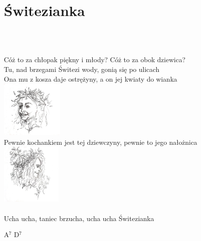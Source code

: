 \documentclass[a5paper, 10pt]{book}
\begin{document}
\section{Świtezianka}\textcolor{lightgray}{\textit{}}\\~\\
\begin{minipage}[t]{0.8\textwidth}
Cóż to za chłopak piękny i młody? Cóż to za obok dziewica?\\
Tu, nad brzegami Świtezi wody, gonią się po ulicach\\
Ona mu z kosza daje ostrężyny, a on jej kwiaty do wianka\\
\vspace*{10mm}\hspace*{10cm}\includegraphics[height=2.8cm]{switezianka.png}\vspace*{-3.2cm}\\
Pewnie kochankiem jest tej dziewczyny, pewnie to jego nałożnica\\
\hspace*{8.5cm}\includegraphics[height=3cm]{switezianka2.png}\vspace*{-3.1cm}\\
\\
\hspace*{5mm}Ucha ucha, taniec brzucha, ucha ucha Świtezianka\\
\end{minipage}
\begin{minipage}[t]{0.2\textwidth}
A$^7$ D$^7$\\

\end{minipage}

\newpage
\end{document}
